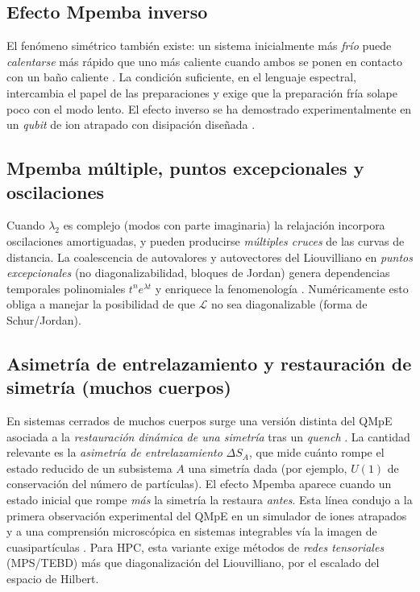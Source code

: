 \documentclass[11pt,a4paper]{article}
\theoremstyle{definition}
\theoremstyle{plain}
\newcommand{\Lop}{\mathcal{L}}
\begin{document}
\subsection{Efecto Mpemba inverso}

El fenómeno simétrico también existe: un sistema inicialmente más \emph{frío} puede \emph{calentarse} más
rápido que uno más caliente cuando ambos se ponen en contacto con un baño caliente
\cite{LuRaz2017,AharonyShapira2024}. La condición suficiente, en el lenguaje espectral, intercambia el papel
de las preparaciones y exige que la preparación fría solape poco con el modo lento. El efecto inverso se ha
demostrado experimentalmente en un \emph{qubit} de ion atrapado con disipación diseñada
\cite{AharonyShapira2024}.

\subsection{Mpemba múltiple, puntos excepcionales y oscilaciones}

Cuando $\lambda_2$ es complejo (modos con parte imaginaria) la relajación incorpora oscilaciones
amortiguadas, y pueden producirse \emph{múltiples cruces} de las curvas de distancia. La coalescencia de
autovalores y autovectores del Liouvilliano en \emph{puntos excepcionales} (no diagonalizabilidad,
bloques de Jordan) genera dependencias temporales polinomiales $t^{n}e^{\lambda t}$ y enriquece la
fenomenología \cite{Chatterjee2024,Minganti2018}. Numéricamente esto obliga a manejar la posibilidad de que
$\Lop$ no sea diagonalizable (forma de Schur/Jordan).

\subsection{Asimetría de entrelazamiento y restauración de simetría (muchos cuerpos)}

En sistemas cerrados de muchos cuerpos surge una versión distinta del QMpE asociada a la \emph{restauración
dinámica de una simetría} tras un \emph{quench} \cite{AresCalabreseMurciano2025,Murciano2024,Rylands2024,Liu2024,Joshi2024}.
La cantidad relevante es la \emph{asimetría de entrelazamiento} $\Delta S_A$, que mide cuánto rompe el estado
reducido de un subsistema $A$ una simetría dada (por ejemplo, $U(1)$ de conservación del número de
partículas). El efecto Mpemba aparece cuando un estado inicial que rompe \emph{más} la simetría la
restaura \emph{antes}. Esta línea condujo a la primera observación experimental del QMpE en un simulador de
iones atrapados \cite{Joshi2024} y a una comprensión microscópica en sistemas integrables vía la imagen de
cuasipartículas \cite{Rylands2024}. Para HPC, esta variante exige métodos de \emph{redes tensoriales}
(MPS/TEBD) más que diagonalización del Liouvilliano, por el escalado del espacio de Hilbert.
\end{document}
